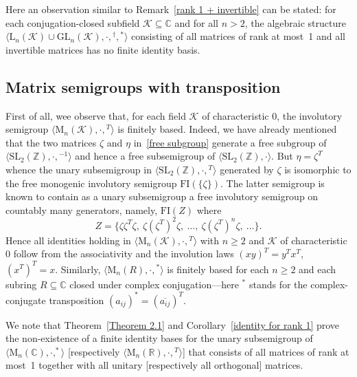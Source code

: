 \documentclass[11pt,reqno]{amsart}
\numberwithin{equation}{section}
\def\bb{\mathbb}
\theoremstyle{remark}
\def\ol{\overline}
\begin{document}
Here an observation similar to Remark~\ref{rank 1 + invertible}
can be stated: for each con\-jugation-closed subfield
$\mathcal{K}\subseteq\bb C$ and for all $n>2$, the algebraic
structure
$\langle\mathrm{L}_n(\mathcal{K})\cup\mathrm{GL}_n(\mathcal{K}),\cdot,{}^\dag,{}^*\rangle$
consisting of all matrices of rank at most~1 and all invertible
matrices has no finite identity basis.


\subsection{Matrix semigroups with transposition}
First of all, wee observe that, for each field $\mathcal{K}$ of
characteristic $0$, the involutory semigroup
$\langle\mathrm{M}_n(\mathcal{K}),\cdot,{}^T\rangle$ is finitely
based. Indeed, we have already mentioned that the two matrices
$\zeta$ and $\eta$ in~\eqref{free subgroup} generate a free
subgroup of $\langle\mathrm{SL}_2(\bb Z),\cdot,{}^{-1}\rangle$ and
hence a free subsemigroup of $\langle\mathrm{SL}_2(\bb Z),
\cdot\rangle$. But $\eta=\zeta^T$ whence the unary subsemigroup in
$\langle\mathrm{SL}_2(\bb Z),\cdot,{}^T\rangle$ generated by
$\zeta$ is isomorphic to the free monogenic involutory semigroup
$\mathrm{FI}(\{\zeta\})$. The latter semigroup is known to contain
as a unary subsemigroup a free involutory semigroup on countably
many generators, namely, $\mathrm{FI}(Z)$ where
$$Z=\{\zeta \zeta ^T\zeta ,\ \zeta (\zeta ^T)^2\zeta ,\ \dots,\ \zeta (\zeta ^T)^n\zeta ,\ \dots\}.$$
Hence all identities holding in
$\langle\mathrm{M}_n(\mathcal{K}),\cdot,{}^T\rangle$ with $n\ge 2$
and $\mathcal{K}$ of characteristic $0$ follow from the
associativity and the involution laws $(xy)^T = y^Tx^T$, $(x^T)^T
= x$. Similarly, $\langle\mathrm{M}_n(R),\cdot,{}^*\rangle$ is
finitely based for each $n \ge 2$ and each subring $R\subseteq \bb
C$ closed under complex conjugation---here ${}^*$ stands for the
complex-conjugate transposition $(a_{ij})^*= (\ol{a_{ij}})^T$.

We note that Theorem~\ref{Theorem 2.1} and Corollary~\ref{identity
for rank 1} prove the non-existence of a finite identity bases for
the unary subsemigroup of $\langle\mathrm{M}_n(\bb
C),\cdot,^*\rangle$ [respectively $\langle\mathrm{M}_n(\bb
R),\cdot,{}^T\rangle$] that consists of all matrices of rank at
most~1 together with all unitary [respectively all orthogonal]
matrices.
\end{document}
